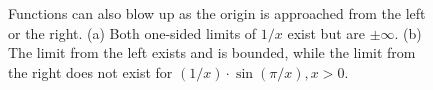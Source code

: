 \begin{figure}[htb]%
\centering
{}%
%
\caption[]{Functions can also blow up as the origin is approached from the left or the right. (a) Both one-sided limits of $1/x$ exist but are $\pm \infty$. (b) The limit from the left exists and is bounded, while the limit from the right does not exist for $(1/x)\cdot \sin(\pi/x), x>0$.}
    \label{fig:OneSidedLimitsNotExisting}
\end{figure}

\bigskip


